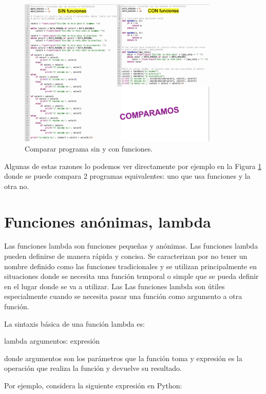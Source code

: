 \begin{figure}[t]
    \centering
    \includegraphics[width=0.85\textwidth]{images/sin-con-funciones.png}
    \caption{Comparar programa sin y con funciones.}
    \label{fig:sin.con.funciones}
\end{figure}


Algunas de estas razones lo podemos ver directamente por ejemplo en la Figura \ref{fig:sin.con.funciones} donde se puede compara 2 programas equivalentes: uno que usa funciones y la otra no.


\section{Funciones anónimas, lambda}
 

Las funciones lambda son funciones pequeñas y anónimas.
Las funciones lambda pueden definirse de manera rápida y concisa. Se caracterizan por no tener un nombre definido como las funciones tradicionales y se utilizan principalmente en situaciones donde se necesita una función temporal o simple que se pueda definir en el lugar donde se va a utilizar. Las Las funciones lambda son útiles especialmente cuando se necesita pasar una función como argumento a otra función.

La sintaxis básica de una función lambda es:

\begin{python}
lambda argumentos: expresión
\end{python}

donde argumentos son los parámetros que la función toma y expresión es la operación que realiza la función y devuelve su resultado. 

Por ejemplo, considera la siguiente expresión en Python:

